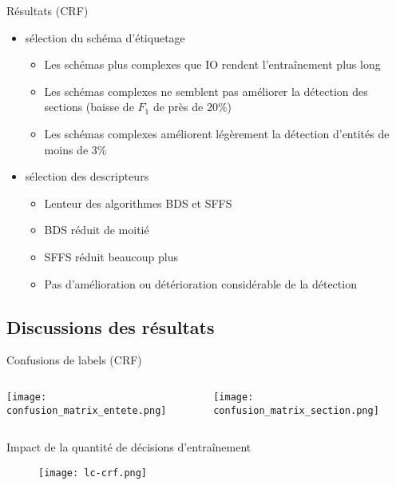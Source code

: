 \begin{frame}[t]{\mysubsectiontitle}
	Résultats (CRF)
	
	\begin{itemize}
		\item sélection du schéma d'étiquetage
		\begin{itemize}
			\item Les schémas plus complexes que IO rendent l'entraînement plus long
			\item Les schémas complexes ne semblent pas améliorer la détection des sections (baisse de $F_1$ de près de $20\%$)
			\item Les schémas complexes améliorent légèrement la détection d'entités de moins de $3\%$
		\end{itemize}
		\item sélection des descripteurs
		\begin{itemize}
			\item Lenteur des algorithmes BDS et SFFS 
			\item BDS réduit de moitié
			\item SFFS réduit beaucoup plus
			\item Pas d'amélioration ou détérioration considérable de la détection
		\end{itemize}
	\end{itemize}
\end{frame}

\subsection{Discussions des résultats}
\begin{frame}[t]{\mysubsectiontitle}
	Confusions de labels (CRF)
	
	{}
\begin{columns}\tiny
	\begin{column}{.68\linewidth}
		\texttt{[image: confusion\_matrix\_entete.png]} 
	\end{column}
	\begin{column}{.3\linewidth}
		\texttt{[image: confusion\_matrix\_section.png]}
	\end{column}
\end{columns}
\end{frame}

\begin{frame}[t]{\mysubsectiontitle}
	Impact de la quantité de décisions d'entraînement
	
\begin{figure}[!h]
\texttt{[image: lc-crf.png]}
\end{figure}
\end{frame}

